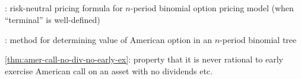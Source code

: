 \subsection*{}
\item {}: risk-neutral pricing formula for \(n\)-period binomial option pricing model (when ``terminal'' is well-defined)
\item {}: method for determining value of American option in an \(n\)-period binomial tree
\item \cref{thm:amer-call-no-div-no-early-ex}: property that it is never rational to early exercise American call on an asset with no dividends etc.
